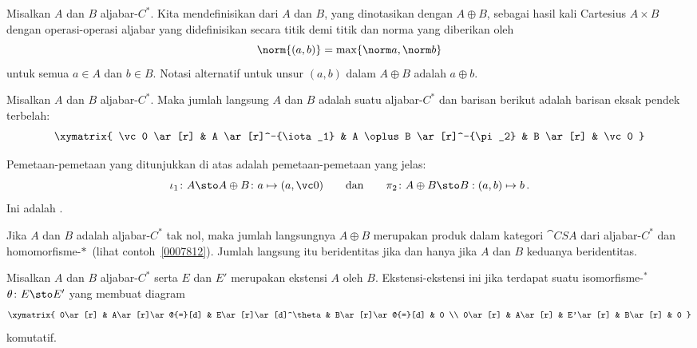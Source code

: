 \begin{defn} Misalkan $A$ dan $B$ aljabar-$C^*$. Kita mendefinisikan
 dari $A$ dan $B$, yang dinotasikan dengan $A \oplus B$,
sebagai hasil kali Cartesius $A \times B$ dengan operasi-operasi aljabar yang didefinisikan
secara titik demi titik dan norma yang diberikan oleh
   \[ \norm{(a,b)} = \max\{\norm a,\norm b\} \]
untuk semua $a \in A$ dan $b \in B$. Notasi alternatif untuk unsur $(a,b)$ dalam
$A \oplus B$
adalah $a \oplus b$.
\end{defn}

\begin{exam} Misalkan $A$ dan $B$ aljabar-$C^*$. Maka jumlah langsung $A$ dan $B$ adalah
suatu aljabar-$C^*$ dan barisan berikut adalah barisan eksak pendek terbelah:
 \[\xymatrix{
    \vc 0 \ar[r] & A \ar[r]^-{\iota_1} & A \oplus B \ar[r]^-{\pi_2}
             & B \ar[r] & \vc 0
 }\]
\end{exam}
\noindent Pemetaan-pemetaan yang ditunjukkan di atas adalah pemetaan-pemetaan yang jelas:
   \[ \iota_1\colon A \sto A \oplus B\colon a \mapsto (a,\vc 0) \qquad
        \text{dan} \qquad  \pi_2 \colon A \oplus B \sto B: (a,b) \mapsto b\,. \]
Ini adalah .

\begin{prop} Jika $A$ dan $B$ adalah aljabar-$C^*$ tak nol, maka
jumlah langsungnya $A \oplus B$ merupakan produk dalam kategori $\cat{CSA}$ dari
aljabar-$C^*$ dan homomorfisme-$*\,$ (lihat contoh~\ref{0007812}). Jumlah langsung itu
beridentitas jika dan hanya jika $A$ dan $B$ keduanya beridentitas.
\end{prop}

\begin{defn}\label{0015151} Misalkan $A$ dan $B$ aljabar-$C^*$ serta $E$ dan $E'$ merupakan
ekstensi $A$ oleh $B$. Ekstensi-ekstensi ini
 jika terdapat suatu isomorfisme-${}^*$ $\theta\colon E \sto E'$
yang membuat diagram
 \[\xymatrix{
     0\ar[r] & A\ar[r]\ar@{=}[d] & E\ar[r]\ar[d]^\theta
             & B\ar[r]\ar@{=}[d] & 0 \\
     0\ar[r] & A\ar[r] & E'\ar[r] & B\ar[r] & 0
 }\]
komutatif.
\end{defn}

